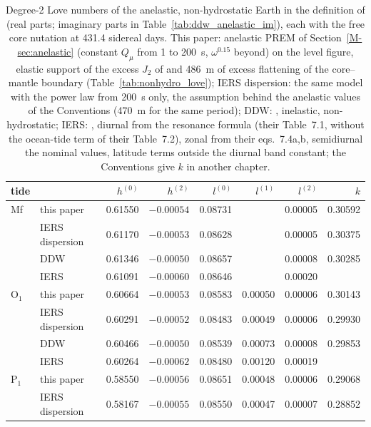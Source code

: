 \begin{table}
\caption{Degree-2 Love numbers of the anelastic, non-hydrostatic Earth in the definition of \citet{mathews1995} (real parts; imaginary parts in Table~\ref{tab:ddw_anelastic_im}), each with the free core nutation at 431.4 sidereal days. This paper: anelastic PREM of Section~\ref{M-sec:anelastic} (constant $Q_\mu$ from 1 to 200~s, $\omega^{0.15}$ beyond) on the level figure, elastic support of the excess $J_2$ of \citet{chambat2010} and 486~m of excess flattening of the core--mantle boundary (Table~\ref{tab:nonhydro_love}); IERS dispersion: the same model with the power law from 200~s only, the assumption behind the anelastic values of the Conventions \citep{mathews1997} (470~m for the same period); DDW: \citet[][tables 11 and 12]{dehant1999}, inelastic, non-hydrostatic; IERS: \citet{petit2010}, diurnal from the resonance formula (their Table~7.1, without the ocean-tide term of their Table~7.2), zonal from their eqs.~7.4a,b, semidiurnal the nominal values, latitude terms outside the diurnal band constant; the Conventions give $k$ in another chapter.}
\label{tab:ddw_anelastic}
\small\setlength{\tabcolsep}{3pt}
\begin{tabular*}{\textwidth}{@{\extracolsep{\fill}}llrrrrrr@{}}
\toprule
tide & & $h^{(0)}$ & $h^{(2)}$ & $l^{(0)}$ & $l^{(1)}$ & $l^{(2)}$ & $k$ \\
\midrule
Mf & this paper & 0.61550 & $-0.00054$ & 0.08731 &  & 0.00005 & 0.30592 \\
 & IERS dispersion & 0.61170 & $-0.00053$ & 0.08628 &  & 0.00005 & 0.30375 \\
 & DDW & 0.61346 & $-0.00050$ & 0.08657 &  & 0.00008 & 0.30285 \\
 & IERS & 0.61091 & $-0.00060$ & 0.08646 &  & 0.00020 &  \\
\addlinespace[2pt]
O$_1$ & this paper & 0.60664 & $-0.00053$ & 0.08583 & 0.00050 & 0.00006 & 0.30143 \\
 & IERS dispersion & 0.60291 & $-0.00052$ & 0.08483 & 0.00049 & 0.00006 & 0.29930 \\
 & DDW & 0.60466 & $-0.00050$ & 0.08539 & 0.00073 & 0.00008 & 0.29853 \\
 & IERS & 0.60264 & $-0.00062$ & 0.08480 & 0.00120 & 0.00019 &  \\
\addlinespace[2pt]
P$_1$ & this paper & 0.58550 & $-0.00056$ & 0.08651 & 0.00048 & 0.00006 & 0.29068 \\
 & IERS dispersion & 0.58167 & $-0.00055$ & 0.08550 & 0.00047 & 0.00007 & 0.28852 \\

\end{tabular*}
\end{table}
